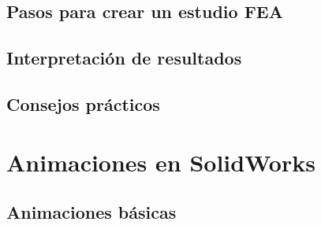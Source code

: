 \subsection{Pasos para crear un estudio FEA}

\subsection{Interpretación de resultados}

\subsection{Consejos prácticos}

\section{Animaciones en SolidWorks}

\subsection{Animaciones básicas}

